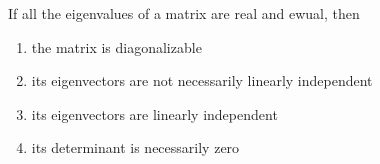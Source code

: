 \item If all the eigenvalues of a matrix are real and ewual, then
\hfill{}
\begin{enumerate}
\item the matrix is diagonalizable
\item its eigenvectors are not necessarily linearly independent
\item its eigenvectors are linearly independent
\item its determinant is necessarily zero
\end{enumerate}
